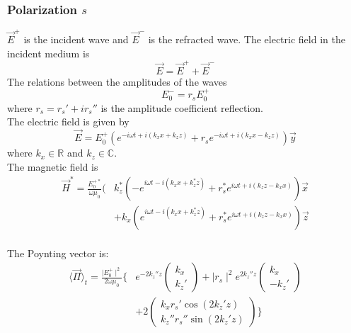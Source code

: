 \subsubsection{Polarization $s$}
$\vec{E}^+$ is the incident wave and $\vec{E}^-$ is the refracted wave. The electric field in the incident medium is
\begin{equation*}
\vec{E}=\vec{E}^++\vec{E}^-
\end{equation*}
The relations between the amplitudes of the waves
\begin{equation*}
E^-_0=r_sE^+_0
\end{equation*}
where $r_s=r_s'+ir_s''$ is the amplitude coefficient reflection.\\
The electric field is given by $$\vec{E}=E^+_0(e^{-i\omega t+i(k_xx+k_zz)}+r_se^{-i\omega t+i(k_xx-k_zz)})\vec{y}$$
where $k_x\in \mathbb{R}$ and $k_z\in \mathbb{C}$.\\
The magnetic field is\\
\begin{align*}
\vec{H}^*=\frac{E^{+*}_0}{\omega \mu _0}(&k_z^*(-e^{i\omega t-i(k_xx+k_z^*z)}+r_s^*e^{i\omega t+i(k_zz-k_xx)})\vec{x}\\
&+k_x(e^{i\omega t-i(k_xx+k_z^*z)}+r_s^*e^{i\omega t+i(k_zz-k_xx)})\vec{z}
\end{align*}\\
The Poynting vector is:\\
\begin{align*}
\langle \vec{\Pi} \rangle _t= \displaystyle\frac{\displaystyle \mid E^+_0\mid ^2}{\displaystyle 2\omega \mu _0}\Big\{&
e^{-2k_z''z}
\begin{pmatrix}
k_x\\
k_z'
\end{pmatrix}
+\mid r_s\mid ^2e^{2k_z''z}
\begin{pmatrix}
k_x\\
-k_z'
\end{pmatrix}\\
&+2
\begin{pmatrix}
k_xr_s'\cos(2k_z'z)\\
k_z''r_s''\sin(2k_z'z)
\end{pmatrix}
\Big\}
\end{align*}

